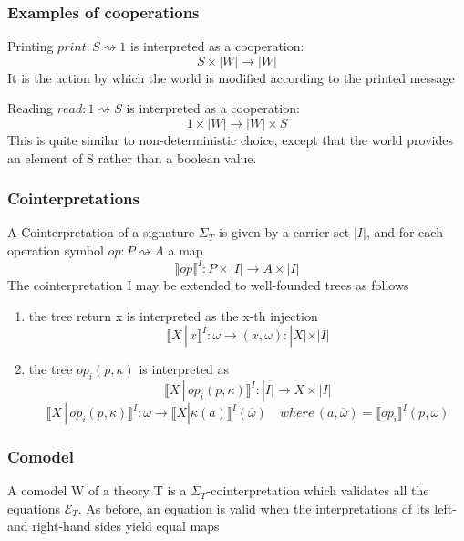 \documentclass{beamer}
\begin{document}
\begin{frame}
    \frametitle{Examples of cooperations}
    \begin{example}
        Printing $print : S \rightsquigarrow 1$ is interpreted as a cooperation:
        \[
          S \times |W| \rightarrow  |W|  
        \]
        It is the action by which the world is modified according to the printed message 
    \end{example}
    \begin{example}
        Reading $read : 1 \rightsquigarrow S$ is interpreted as a cooperation:
        \[
          1 \times |W| \rightarrow  |W| \times S 
        \]
        This is quite similar to non-deterministic choice, except that the world provides an element
of S rather than a boolean value.
    \end{example}
 

    

\end{frame}
\begin{frame}
    \frametitle{Cointerpretations}
    A Cointerpretation of a signature $\Sigma_T$ is given by a carrier set $|I|$, and for each operation symbol
    $op : P \rightsquigarrow A$ a map 
    \[
      \rrbracket op \llbracket^I : P \times |I| \rightarrow A \times |I|  
    \]
    The cointerpretation I may be extended to well-founded trees as follows
    \begin{enumerate}
        \item the tree return x is interpreted as the x-th injection 
        \[
          \llbracket X \, | \, x \rrbracket^I : \omega \rightarrow (x, \omega) : |X| \times|I|   
        \]
        \item the tree $op_i(p, \kappa)$ is interpreted as 
         \[
            \llbracket X \, | \, op_i(p, \kappa) \rrbracket^I : |I| \rightarrow X \times |I|
        \]
        \[
            \llbracket X \, | \, op_i(p, \kappa) \rrbracket^I : \omega \rightarrow \llbracket X 
            | \kappa(a) \rrbracket^I (\overline{\omega}) 
            \quad where \, (a, \overline{\omega}) = \llbracket op_i \rrbracket^I(p, \omega)
        \]
       
    \end{enumerate}

    

\end{frame}
\begin{frame}
    \frametitle{Comodel}
    A comodel W of a theory T is a $\Sigma_T$-cointerpretation which validates all the equations $\mathcal{E}_T$.
As before, an equation is valid when the interpretations of its left- and right-hand sides
yield equal maps

    

\end{frame}
\end{document}
